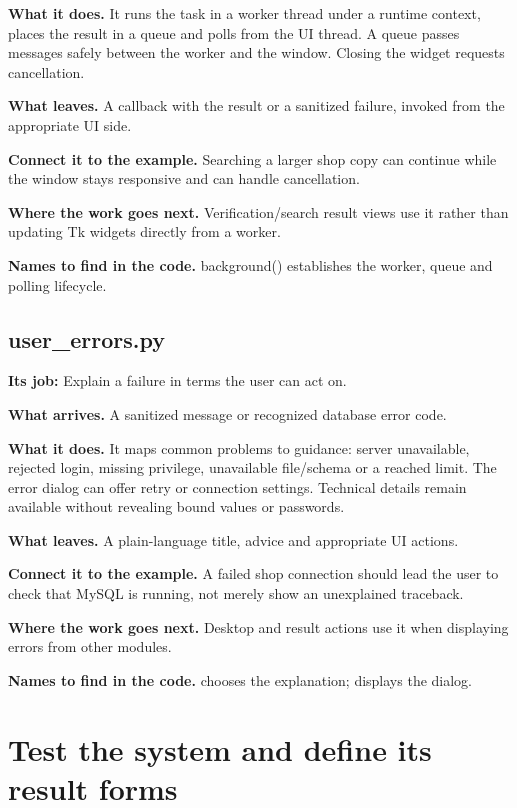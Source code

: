 \textbf{What it does.} It runs the task in a worker thread under a runtime context, places the result in a queue and polls from the UI thread. A queue passes messages safely between the worker and the window. Closing the widget requests cancellation.

\textbf{What leaves.} A callback with the result or a sanitized failure, invoked from the appropriate UI side.

\textbf{Connect it to the example.} Searching a larger shop copy can continue while the window stays responsive and can handle cancellation.

\textbf{Where the work goes next.} Verification/search result views use it rather than updating Tk widgets directly from a worker.

\textbf{Names to find in the code.} background() establishes the worker, queue and polling lifecycle.


\subsection{user\_errors.py}

\textbf{Its job:} Explain a failure in terms the user can act on.

\textbf{What arrives.} A sanitized message or recognized database error code.

\textbf{What it does.} It maps common problems to guidance: server unavailable, rejected login, missing privilege, unavailable file/schema or a reached limit. The error dialog can offer retry or connection settings. Technical details remain available without revealing bound values or passwords.

\textbf{What leaves.} A plain-language title, advice and appropriate UI actions.

\textbf{Connect it to the example.} A failed shop connection should lead the user to check that MySQL is running, not merely show an unexplained traceback.

\textbf{Where the work goes next.} Desktop and result actions use it when displaying errors from other modules.

\textbf{Names to find in the code.}  chooses the explanation;  displays the dialog.

\section{Test the system and define its result forms}

